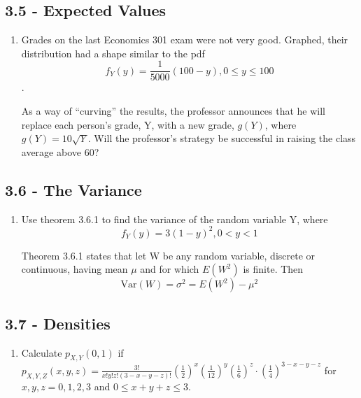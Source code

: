\documentclass{article}
\begin{document}
\subsection*{3.5 - Expected Values}
\begin{enumerate}
	\item[33.] Grades on the last Economics 301 exam were not very good. Graphed, their distribution had a shape similar to the pdf
		\[
			f_Y(y) = \frac{1}{5000} (100 - y), 0 \leq y \leq 100
		\].

	As a way of “curving” the results, the professor announces that he will replace each person’s grade, Y, with a new grade, \(g(Y)\), where \(g(Y) = 10 \sqrt{Y}\). Will the professor's strategy be successful in raising the class average above 60?
\end{enumerate}

\subsection*{3.6 - The Variance}
\begin{enumerate}
	\item[5.] Use theorem 3.6.1 to find the variance of the random variable Y, where
		\[
			f_Y(y) = 3(1 - y)^2, 0 < y < 1
		\]

	Theorem 3.6.1 states that let W be any random variable, discrete or continuous, having mean \(\mu\) and for which \(E(W^2)\) is finite. Then
		\[
			\textrm{Var}(W) = \sigma^2 = E(W^2) - \mu^2
		\] 
\end{enumerate}

\subsection*{3.7 - Densities}
\begin{enumerate}
	\item[35.] Calculate \(p_{X, Y} (0, 1)\) if \(p_{X, Y, Z} (x, y, z) = \frac{3!}{x! y! z! (3 - x - y - z)!} (\frac{1}{2})^x (\frac{1}{12})^y (\frac{1}{6})^z \cdot (\frac{1}{4})^{3 - x - y - z}\) for \(x, y, z = 0, 1, 2, 3\) and \(0 \leq x + y + z \leq 3\).
\end{enumerate}
\end{document}
